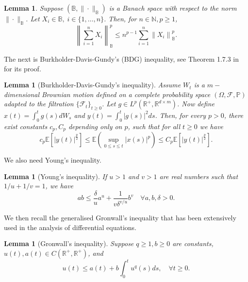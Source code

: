 \documentclass[a4paper,12pt]{article}
\numberwithin{equation}{section}
\theoremstyle{plain}
\newtheorem{lemma}[theorem]{Lemma}
\theoremstyle{definition}
\begin{document}
\begin{appendix}
\begin{lemma}\label{lemma:open_p_bracket}
    Suppose $\left(\mathbb{B},\|\cdot\|_{\mathbb{B}}\right)$ is a Banach space with respect to the norm $\|\cdot\|_{\mathbb{B}}$. Let $X_i\in \mathbb{B},\; i\in \{1,\dots,n\}$. Then, for $n\in \mathbb{N},p\geq 1$, 
    \begin{equation}\label{equation:open pth bracket}
        \left\|\sum_{i=1}^n X_i\right\|_{\mathbb{B}}^p \leq n^{p-1} \sum_{i=1}^n\left\|X_i\right\|_{\mathbb{B}}^p.
    \end{equation}
\end{lemma}
\noindent The next is Burkholder-Davis-Gundy's  (BDG) inequality, see Theorem 1.7.3 in \cite{mao_stochastic_2011} for its proof.
\begin{lemma}[Burkholder-Davis-Gundy's inequality]\label{lemma:BDG_inequality}
    Assume $W_t$ is a $m-$dimensional Brownian motion defined on a complete probability space $(\Omega,\mathcal{F},\mathbb{P})$ adapted to the filtration $\{\mathcal{F}_t\}_{t\geq0}$. Let $g\in L^p(\mathbb{R}^+,\mathbb{R}^{d\times m})$. 
    Now define $x(t)=\int_0^t g(s) d W_s$ and $y(t)=\int_0^t|g(s)|^2 d s$. Then, for every $p>0$, there exist constants $c_p, C_p$ depending only on $p$, such that for all $t\geq 0$ we have
    \begin{equation}\label{eqn:BDG inequality}
        c_p \mathbb{E}[|y(t)|^{\frac{p}{2}}] \leq \mathbb{E}\left(\sup _{0 \leq s \leq t}|x(s)|^p\right) \leq C_p \mathbb{E}[|y(t)|^{\frac{p}{2}}].
    \end{equation}
\end{lemma}
We also need Young's inequality. 
\begin{lemma}[Young's inequality]\label{lemma:Youngs inequality}
If $u>1$ and $v>1$ are real numbers such that $1/u+1/v=1$, we have
    \begin{equation}\label{eqn:Young's inequality}
        a b \leq \frac{\delta}{u} a^u+\frac{1}{v \delta^{v / u}} b^v \quad \forall a, b, \delta>0 .
    \end{equation}
\end{lemma}
We then recall the generalised Gronwall's inequality \cite{mao_stochastic_2011,tian2020nonlinear} that has been extensively used  in the analysis of differential equations. 
\begin{lemma}[Gronwall's inequality]\label{lemma:Gronwall}
    Suppose $q\geq 1,b\geq 0$ are constants, $u(t),a(t)\in C(\mathbb{R}^+,\mathbb{R}^+)$, and
    \begin{equation*}
        u(t)\leq a(t)+b\int_0^t u^q(s)ds, \quad \forall t\geq 0.

\end{equation*}
\end{lemma}
\end{appendix}
\end{document}
